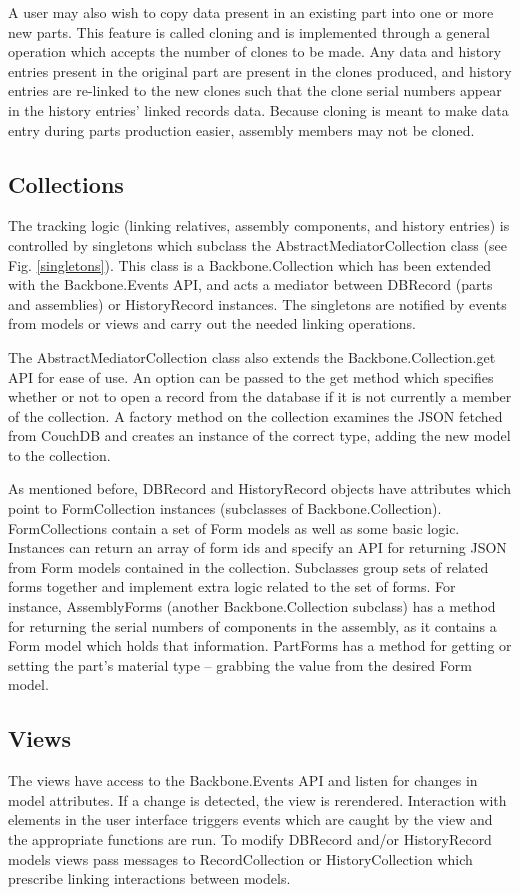 \documentclass[journal]{IEEEtran}
\begin{document}
A user may also wish to copy data present in an existing part into one or more new parts. This
feature is called cloning and is implemented through a general operation which accepts the number
of clones to be made. Any data and history entries present in the original part are present in the
clones produced, and history entries are re-linked to the new clones such that the clone serial
numbers appear in the history entries' linked records data. Because cloning is meant to make
data entry during parts production easier, assembly members may not be cloned. 

\subsection{Collections}
The tracking logic (linking relatives, assembly components, and history entries) is controlled
by singletons which subclass the AbstractMediatorCollection class (see Fig. \ref{singletons}). This class is a Backbone.Collection
which has been extended with the Backbone.Events API, and acts a mediator between DBRecord (parts and assemblies) or
HistoryRecord instances. The singletons are notified by events from models or views and carry out the needed
linking operations.

The AbstractMediatorCollection class also extends the
Backbone.Collection.get API for ease of use. An option can be passed to the get method which
specifies whether or not to open a record from the database if it is not currently a member
of the collection.
A factory method on the collection examines the JSON
fetched from CouchDB and creates an instance of the correct type, adding the new model
to the collection. 

As mentioned before, DBRecord and HistoryRecord objects have attributes which point to FormCollection instances (subclasses
of Backbone.Collection).
FormCollections contain a set of Form models as well as some basic logic. Instances can return an array of form ids
and specify an API for returning JSON from Form models contained in the collection. Subclasses 
group sets of related forms together and implement extra logic related to the set of forms. For instance, AssemblyForms (another Backbone.Collection
subclass)
has a method for returning the serial numbers of components in the assembly, as it contains a Form model which holds
that information. PartForms has a method for getting or setting the part's material type -- grabbing the value from the
desired Form model.

\subsection{Views}
The views have access to the Backbone.Events API and listen for changes in model attributes. If a change is detected,
the view is rerendered. Interaction with elements in the user interface triggers events which are caught by the view and the appropriate
functions are run. To modify DBRecord and/or HistoryRecord models views pass messages to 
RecordCollection or HistoryCollection which prescribe linking interactions between models.
\end{document}
